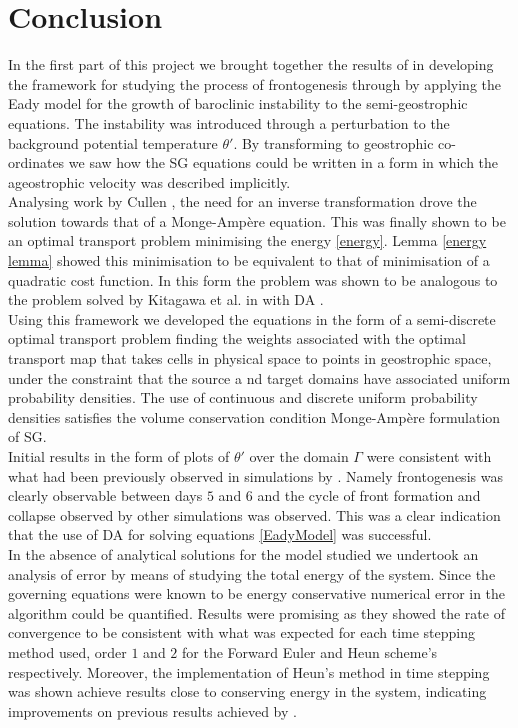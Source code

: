 \chapter*{Conclusion}
In the first part of this project we brought together the results of \cite{Hoskins1975,Shutts1987,Cullen2006a} in developing the framework for studying the process of frontogenesis through by applying the Eady model for the growth of baroclinic instability to the semi-geostrophic equations. The instability was introduced through a perturbation to the background potential temperature $\theta '$. By transforming to geostrophic co-ordinates we saw how the SG equations could be written in a form in which the ageostrophic velocity was described implicitly.
\\
\linebreak
Analysing work by Cullen \cite{Cullen2006a}, the need for an inverse transformation drove the solution towards that of a Monge-Amp\`{e}re equation. This was finally shown to be an optimal transport problem minimising the energy \ref{energy}. Lemma \ref{energy lemma} showed this minimisation to be equivalent to that of minimisation of a quadratic cost function. In this form the problem was shown to be analogous to the problem solved by Kitagawa et al. in \cite{Kitagawa2016} with DA \cite{Merigot2017a}.
\\
\linebreak
Using this framework we developed the equations in the form of a semi-discrete optimal transport problem finding the weights associated with the optimal transport map that takes cells in physical space to points in geostrophic space, under the constraint that the source a nd target domains have associated uniform probability densities. The use of continuous and discrete uniform probability densities satisfies the volume conservation condition Monge-Amp\`{e}re formulation of SG.
\\
\linebreak
Initial results in the form of plots of $\theta '$ over the domain $\Gamma$ were consistent with what had been previously observed in simulations by \cite{Cullen1993, Nakamura1994}. Namely frontogenesis was clearly observable between days $5$ and $6$ and the cycle of front formation and collapse observed by other simulations was observed. This was a clear indication that the use of DA for solving equations \ref{EadyModel} was successful.
\\
\linebreak 
In the absence of analytical solutions for the model studied we undertook an analysis of error by means of studying the total energy of the system. Since the governing equations were known to be energy conservative \cite{Cullen2006a} numerical error in the algorithm could be quantified. Results were promising as they showed the rate of convergence to be consistent with what was expected for each time stepping method used, order $1$ and $2$ for the Forward Euler and Heun scheme's respectively. Moreover, the implementation of Heun's method in time stepping was shown achieve results close to conserving energy in the system, indicating improvements on previous results achieved by \cite{Cullen1993, Nakamura1994}.
